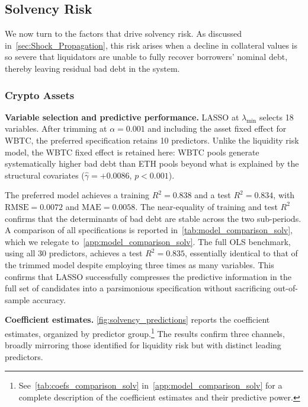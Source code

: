\documentclass[a4paper,UKenglish,cleveref, autoref, thm-restate]{informs3}
\newcommand{\boldpara}[1]{\noindent\textbf{#1}\quad}
\begin{document}
% 


\subsection{Solvency Risk}
\label{sec:results_solvency}

We now turn to the factors that drive solvency risk. As discussed in~\autoref{sec:Shock_Propagation}, this risk arises when a decline in collateral values is so severe that liquidators are unable to fully recover borrowers’ nominal debt, thereby leaving residual bad debt in the system.

\medskip

\subsubsection{Crypto Assets}
\label{sec:results_solvency_crypto}


\boldpara{Variable selection and predictive performance.} LASSO at $\lambda_{\min}$ selects 18 variables. After trimming at $\alpha = 0.001$ and including the asset fixed effect for WBTC, the preferred specification retains 10 predictors. Unlike the liquidity risk model, the WBTC fixed effect is retained here: WBTC pools generate systematically higher bad debt than ETH pools beyond what is explained by the structural covariates ($\hat{\gamma} = +0.0086$, $p < 0.001$).

The preferred model achieves a training $R^2 = 0.838$ and a test $R^2 = 0.834$, with $\text{RMSE} = 0.0072$ and $\text{MAE} = 0.0058$. The near-equality of training and test $R^2$ confirms that the
determinants of bad debt are stable across the two sub-periods.
A comparison of all specifications is reported in~\autoref{tab:model_comparison_solv}, which we relegate to~\ref{app:model_comparison_solv}. The full OLS benchmark, using all 30 predictors, achieves a test $R^2 = 0.835$, essentially identical to that of the trimmed model despite employing three times as many variables. This confirms that LASSO successfully compresses the predictive information in the full set of candidates into a parsimonious specification without sacrificing out-of-sample accuracy.

\medskip

\boldpara{Coefficient estimates.} 
\autoref{fig:solvency_predictions} reports the coefficient
estimates, organized by predictor group.\footnote{See~\autoref{tab:coefs_comparison_solv} in~\ref{app:model_comparison_solv} for a complete description of the coefficient estimates and their predictive power.} The results confirm three
channels, broadly mirroring those identified for liquidity risk but
with distinct leading predictors.
\end{document}
